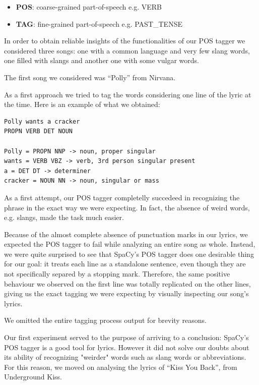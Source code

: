 \begin{itemize}
\item \textbf{POS}: coarse-grained part-of-speech e.g. VERB
\item \textbf{TAG}: fine-grained part-of-speech e.g. PAST\_TENSE
\end{itemize}

In order to obtain reliable insights of the functionalities of our POS tagger we considered three songs:
one with a common language and very few slang words, one filled with slangs and another one with some
vulgar words.

The first song we considered was ``Polly'' from Nirvana.

As a first approach we tried to tag the words considering one line of the lyric at the time. Here is an example of
what we obtained:

\begin{lstlisting}
Polly wants a cracker
PROPN VERB DET NOUN 

Polly = PROPN NNP -> noun, proper singular
wants = VERB VBZ -> verb, 3rd person singular present
a = DET DT -> determiner
cracker = NOUN NN -> noun, singular or mass
\end{lstlisting}

As a first attempt, our POS tagger completelly succedeed in recognizing the phrase in the 
exact way we were expecting. In fact, the absence of weird words, e.g. slangs, made the
task much easier.

Because of the almost complete absence of punctuation marks in our lyrics, we expected
the POS tagger to fail while analyzing an entire song as whole. Instead, we were quite
surprised to see that SpaCy's POS tagger does one desirable thing for our goal:
it treats each line as a standalone sentence, even though they are not specifically separed by
a stopping mark. Therefore, the same positive behaviour we observed on the first line
was totally replicated on the other lines, giving us the exact tagging we were
expecting by visually inspecting our song's lyrics.

We omitted the entire tagging process output for brevity reasons.

Our first experiment served to the purpose of arriving to a conclusion: SpaCy's POS tagger
is a good tool for lyrics. However it did not solve our doubts about its ability of recognizing
"weirder" words such as slang words or abbreviations. For this reason, we moved on 
analysing the lyrics of ``Kiss You Back'', from Underground Kiss.

